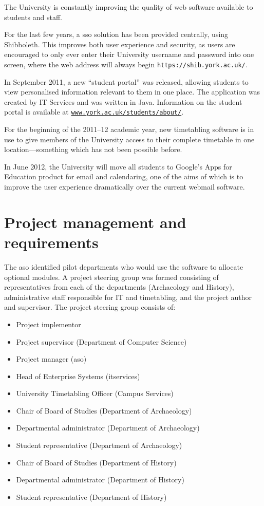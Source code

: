 \documentclass[]{scrartcl}
\begin{document}

The University is constantly improving the quality of web software available
to students and staff.

For the last few years, a \gls{sso} solution has been provided
centrally, using Shibboleth. This improves both user experience and security,
as users are encouraged to only ever enter their University username and
password into one screen, where the web address will always begin
\texttt{https://shib.york.ac.uk/}.

In September 2011, a new ``student portal'' was released, allowing students to
view personalised information relevant to them in one place. The application
was created by IT Services and was written in Java. Information on the student
portal is available at
\texttt{\href{https://www.york.ac.uk/students/about/}{www.york.ac.uk/students/about/}}.

For the beginning of the 2011--12 academic year, new timetabling software is in
use to give members of the University access to their complete timetable in
one location---something which has not been possible before.

In June 2012, the University will move all students to Google's Apps for
Education product for email and calendaring, one of the aims of which is to
improve the user experience dramatically over the current webmail software.

\section{Project management and requirements}
\label{sec:requirements}

The \gls{aso} identified pilot departments who would use the software to
allocate optional modules. A project steering group was formed consisting of
representatives from each of the departments (Archaeology and History),
administrative staff responsible for IT and timetabling, and the project
author and supervisor. The project steering group consists of:

\begin{itemize}
  \item Project implementor
  \item Project supervisor (Department of Computer Science)
  \item Project manager (\gls{aso})
  \item Head of Enterprise Systems (\gls{itservices}) 
  \item University Timetabling Officer (Campus Services)
  \item Chair of Board of Studies (Department of Archaeology)
  \item Departmental administrator (Department of Archaeology)
  \item Student representative (Department of Archaeology)  
  \item Chair of Board of Studies (Department of History)
  \item Departmental administrator (Department of History)
  \item Student representative (Department of History)  
\end{itemize}
\end{document}

